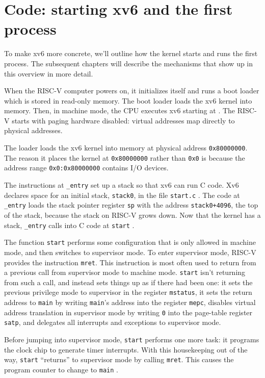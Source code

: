 \section{Code: starting xv6 and the first process}
To make xv6 more concrete, we'll outline how the kernel starts and
runs the first process. The subsequent chapters will describe the
mechanisms that show up in this overview in more detail.

When the RISC-V computer powers on, it initializes
itself and runs a boot loader which is stored in read-only
memory.  The boot loader loads the xv6 kernel into memory.  Then, in
machine mode, the CPU executes xv6 starting at
.
The RISC-V starts with paging hardware disabled:
virtual addresses map directly to physical addresses.

The loader loads the xv6 kernel into memory at physical address
\texttt{0x80000000}.
The reason it places the kernel at
\texttt{0x80000000}
rather than
\texttt{0x0}
is because the address range
\texttt{0x0:0x80000000}
contains I/O devices.

The instructions at
\lstinline{_entry}
set up a stack so that xv6 can run C code.
Xv6 declares space for an initial stack,
\lstinline{stack0},
in the file
\lstinline{start.c}
.
The code at
\lstinline{_entry}
loads the stack pointer register
\texttt{sp}
with the address
\lstinline{stack0+4096},
the top of the stack, because the stack
on RISC-V grows down.
Now that the kernel has a stack,
\lstinline{_entry}
calls into C code at
\lstinline{start}
.

The function
\lstinline{start}
performs some configuration that is only allowed in
machine mode, and then switches to supervisor mode.
To enter supervisor mode, RISC-V
provides the instruction
\lstinline{mret}.
This instruction is most often used to return from
a previous call from supervisor mode to machine mode.
\lstinline{start} isn't returning from such a call, and
instead sets things up as if there had been one:
it sets the previous privilege mode to
supervisor in the register
\lstinline{mstatus},
it sets the return address to
\lstinline{main}
by writing
\lstinline{main}'s
address into
the register
\lstinline{mepc},
disables virtual address translation in supervisor mode
by writing
\lstinline{0}
into the page-table register
\lstinline{satp},
and delegates all interrupts and exceptions
to supervisor mode.

Before jumping into supervisor mode,
\lstinline{start}
performs one more task: it programs the clock
chip to generate timer interrupts.
With this housekeeping out of the way,
\lstinline{start}
``returns'' to supervisor
mode by calling
\lstinline{mret}.
This causes the program counter to change
to
\lstinline{main}
.

